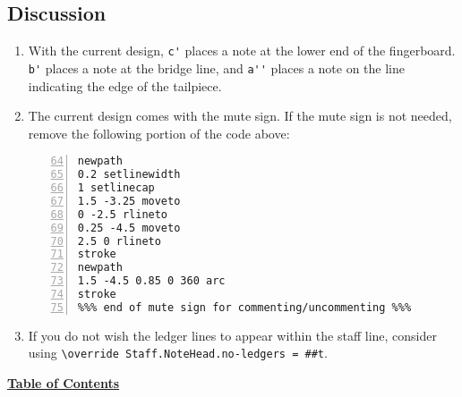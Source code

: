 \subsection{Discussion}
\begin{enumerate}
\item With the current design, \verb|c'| places a note at the lower end of the fingerboard. \verb|b'| places a note at the bridge line, and \verb|a''| places a note on the line indicating the edge of the tailpiece. 

\item The current design comes with the mute sign. If the mute sign is not needed, remove the following portion of the code above:

\begin{Verbatim}[numbers=left,xleftmargin=5mm,firstnumber=64]
%%% mute sign; commentify if not needed %%%
newpath
0.2 setlinewidth
1 setlinecap
1.5 -3.25 moveto
0 -2.5 rlineto
0.25 -4.5 moveto
2.5 0 rlineto
stroke
newpath
1.5 -4.5 0.85 0 360 arc
stroke
%%% end of mute sign for commenting/uncommenting %%%
\end{Verbatim}

\item If you do not wish the ledger lines to appear within the staff line, consider using \verb|\override Staff.NoteHead.no-ledgers = ##t|.
\end{enumerate}

\hyperref[sec:toc]{\textbf{Table of Contents}}

\vfill \break


